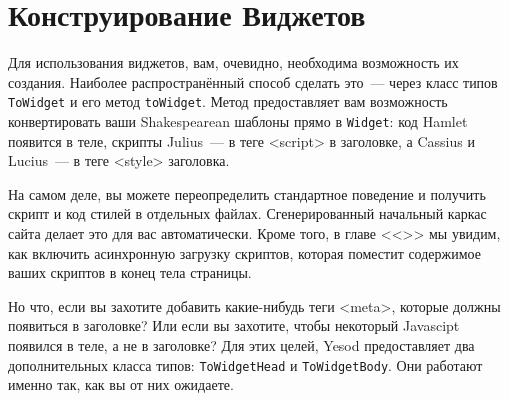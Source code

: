\section{Конструирование Виджетов}
Для использования виджетов, вам, очевидно, необходима возможность их создания.
Наиболее распространённый способ сделать это~--- через класс типов
\lstinline'ToWidget' и его метод \lstinline'toWidget'. Метод предоставляет вам
возможность конвертировать ваши Shakespearean шаблоны прямо в
\lstinline'Widget': код Hamlet появится в теле, скрипты Julius~--- в теге
<script> в заголовке, а Cassius и Lucius~--- в теге <style> заголовка.

\begin{remark}
    На самом деле, вы можете переопределить стандартное поведение и получить
    скрипт и код стилей в отдельных файлах. Сгенерированный начальный каркас
    сайта делает это для вас автоматически. Кроме того, в главе
    <<>> мы увидим, как включить асинхронную
    загрузку скриптов, которая поместит содержимое ваших скриптов в конец тела
    страницы.
\end{remark}

Но что, если вы захотите добавить какие-нибудь теги <meta>, которые должны
появиться в заголовке? Или если вы захотите, чтобы некоторый Javascipt появился
в теле, а не в заголовке? Для этих целей, Yesod предоставляет два
дополнительных класса типов: \lstinline'ToWidgetHead' и
\lstinline'ToWidgetBody'. Они работают именно так, как вы от них ожидаете.


